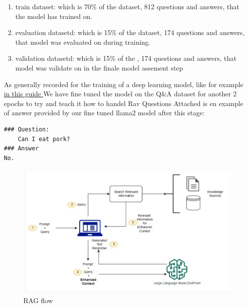\documentclass[11pt]{article}
\begin{document}
\begin{enumerate}
    \item train dataset: which is 70\% of the dataset, 812 questions and answers, that the model has trained on.
    \item evaluation datasetd: which is 15\% of the dataset, 174 questions and answers, that model was evaluated on during training.
    \item validation datasetd: which is 15\% of the , 174 questions and answers, that model was validate on in the finale model assement step 
\end{enumerate}
As generally recorded for the training of a deep learning model, like for example \href{https://encord.com/blog/train-val-test-split/#:~:text=Training%2C%20Validation%2C%20and%20Test%20Set%3A%20Key%20Takeaways,-Here%20are%20the&text=The%20optimal%20split%20ratio%20depends,10%2D20%25%20test%20data. }{in this guide }
We have fine tuned the model on the Q\&A dataset for another 2 epochs to try and teach it how to handel Rav Questions
Attached is en example of answer provided by our fine tuned llama2 model after this stage:
\begin{verbatim}
### Question:
    Can I eat pork?
### Answer
No.
\end{verbatim}

\begin{figure}
    \centering
    \includegraphics[width=1\linewidth]{RAG_flow.png}
    \caption{RAG flow}
    \label{fig:RAG_flowl}
\end{figure}
   
\end{document}
